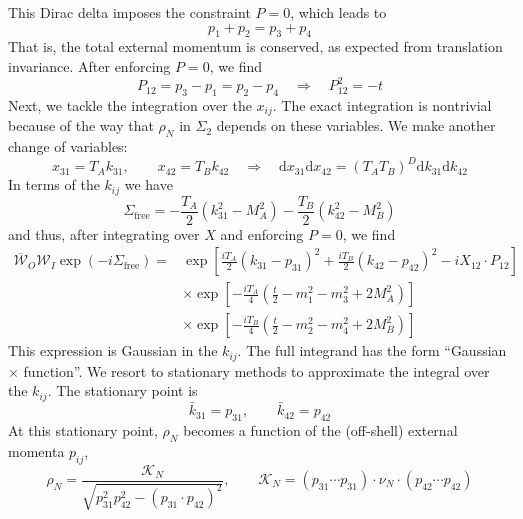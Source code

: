 This Dirac delta imposes the constraint $P = 0$, which leads to
\begin{equation}
	p_{1} + p_{2} = p_{3} + p_{4}
\end{equation}
That is, the total external momentum is conserved, as expected from translation invariance. After enforcing $P = 0$, we find
\begin{equation}
	P_{1 2} = p_{3} - p_{1} = p_{2} - p_{4} \quad \Longrightarrow \quad P_{1 2}^{2} = -t
\end{equation}
Next, we tackle the integration over the $x_{ij}$. The exact integration is nontrivial because of the way that $\rho_{N}$ in $\Sigma_{2}$ depends on these variables. We make another change of variables:
\begin{equation}
	x_{31} = T_{A} k_{31}, \qquad x_{42} = T_{B} k_{42} \quad \Longrightarrow \quad \mathrm{d}x_{31} \mathrm{d}x_{42} = (T_{A} T_{B})^{D} \mathrm{d}k_{31} \mathrm{d}k_{42}
\end{equation}
In terms of the $k_{ij}$ we have
\begin{equation}
	\Sigma_{\text{free}} = -\frac{T_{A}}{2} \left(k_{31}^{2} - M_{A}^{2} \right) - \frac{T_{B}}{2} \left( k_{42}^{2} - M_{B}^{2} \right)
\end{equation}
and thus, after integrating over $X$ and enforcing $P = 0$, we find
\begin{equation}
\begin{split}
	\overline{\mathcal{W}}_{O} \mathcal{W}_{I} \exp{(-i \Sigma_{\text{free}})} = {}& \exp{\left[ \frac{i T_{A}}{2} (k_{31} - p_{31})^{2} + \frac{i T_{B}}{2} (k_{42} - p_{42})^{2} - i X_{12} \cdot P_{12} \right]} \\
	&\times \exp{\left[ -\frac{i T_{A}}{4} \left( \frac{t}{2} -m_{1}^{2} - m_{3}^{2} + 2 M_{A}^{2} \right) \right]} \\
	&\times \exp{\left[ -\frac{i T_{B}}{4} \left( \frac{t}{2} -m_{2}^{2} - m_{4}^{2} + 2 M_{B}^{2} \right) \right]}
\end{split}
\end{equation}
This expression is Gaussian in the $k_{ij}$. The full integrand has the form ``Gaussian $\times$ function''. We resort to stationary methods to approximate the integral over the $k_{ij}$. The stationary point is
\begin{equation}
	\bar{k}_{31} = p_{31}, \qquad \bar{k}_{42} = p_{42}
\end{equation}
At this stationary point, $\rho_{N}$ becomes a function of the (off-shell) external momenta $p_{ij}$,
\begin{equation}
	\rho_{N} = \frac{\mathcal{K}_{N}}{\sqrt{p_{31}^{2} p_{42}^{2} - (p_{31} \cdot p_{42})^{2}}}, \qquad \mathcal{K}_{N} = \left(p_{3 1} \cdots p_{3 1} \right) \cdot \nu_{N} \cdot \left(p_{4 2} \cdots p_{4 2}\right)
\end{equation}

